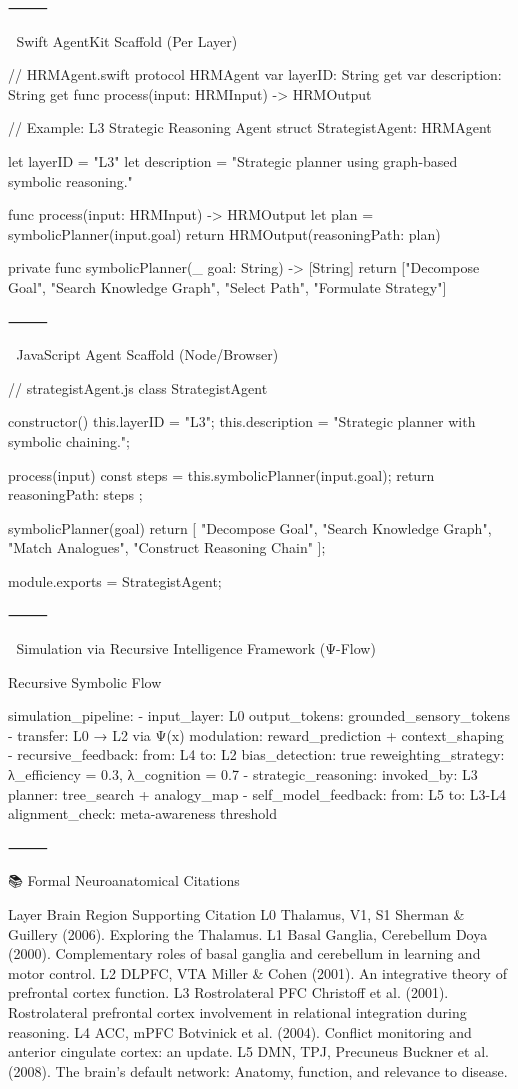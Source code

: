 ⸻

🧠 Swift AgentKit Scaffold (Per Layer)

// HRMAgent.swift
protocol HRMAgent {
    var layerID: String { get }
    var description: String { get }
    func process(input: HRMInput) -> HRMOutput
}

// Example: L3 Strategic Reasoning Agent
struct StrategistAgent: HRMAgent {
    let layerID = "L3"
    let description = "Strategic planner using graph-based symbolic reasoning."

    func process(input: HRMInput) -> HRMOutput {
        let plan = symbolicPlanner(input.goal)
        return HRMOutput(reasoningPath: plan)
    }

    private func symbolicPlanner(_ goal: String) -> [String] {
        return ["Decompose Goal", "Search Knowledge Graph", "Select Path", "Formulate Strategy"]
    }
}


⸻

🧠 JavaScript Agent Scaffold (Node/Browser)

// strategistAgent.js
class StrategistAgent {
  constructor() {
    this.layerID = "L3";
    this.description = "Strategic planner with symbolic chaining.";
  }

  process(input) {
    const steps = this.symbolicPlanner(input.goal);
    return { reasoningPath: steps };
  }

  symbolicPlanner(goal) {
    return [
      "Decompose Goal",
      "Search Knowledge Graph",
      "Match Analogues",
      "Construct Reasoning Chain"
    ];
  }
}

module.exports = StrategistAgent;


⸻

🧪 Simulation via Recursive Intelligence Framework (Ψ-Flow)

Recursive Symbolic Flow

simulation_pipeline:
  - input_layer: L0
    output_tokens: grounded_sensory_tokens
  - transfer: L0 → L2 via Ψ(x)
    modulation: reward_prediction + context_shaping
  - recursive_feedback:
      from: L4
      to: L2
      bias_detection: true
      reweighting_strategy: λ_efficiency = 0.3, λ_cognition = 0.7
  - strategic_reasoning:
      invoked_by: L3
      planner: tree_search + analogy_map
  - self_model_feedback:
      from: L5
      to: L3-L4
      alignment_check: meta-awareness threshold


⸻

📚 Formal Neuroanatomical Citations

Layer	Brain Region	Supporting Citation
L0	Thalamus, V1, S1	Sherman & Guillery (2006). Exploring the Thalamus.
L1	Basal Ganglia, Cerebellum	Doya (2000). Complementary roles of basal ganglia and cerebellum in learning and motor control.
L2	DLPFC, VTA	Miller & Cohen (2001). An integrative theory of prefrontal cortex function.
L3	Rostrolateral PFC	Christoff et al. (2001). Rostrolateral prefrontal cortex involvement in relational integration during reasoning.
L4	ACC, mPFC	Botvinick et al. (2004). Conflict monitoring and anterior cingulate cortex: an update.
L5	DMN, TPJ, Precuneus	Buckner et al. (2008). The brain’s default network: Anatomy, function, and relevance to disease.


